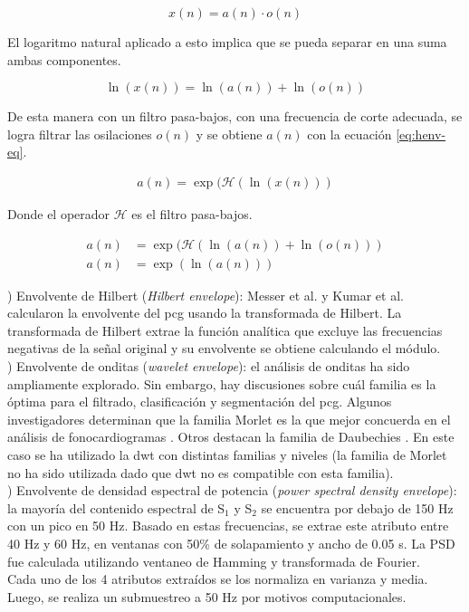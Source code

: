 \begin{equation}
  x(n) = a(n) \cdot o(n)
\end{equation}

El logaritmo natural aplicado a esto implica que se pueda separar en una suma ambas componentes.

\begin{equation}
  \ln(x(n)) = \ln(a(n)) + \ln(o(n))
\end{equation}

De esta manera con un filtro pasa-bajos, con una frecuencia de corte adecuada, se logra filtrar las osilaciones $o
(n)$ y se obtiene $a(n)$ con la ecuación \ref{eq:henv-eq}.

\begin{align} \label{eq:henv-eq}
a(n) = \exp(\mathcal{H}(\ln(x(n)))
\end{align}

Donde el operador $\mathcal{H}$ es el filtro pasa-bajos.

\begin{align*}
  a(n) &= \exp(\mathcal{H}(\ln(a(n)) + \ln(o(n))) \\
  a(n) &= \exp(\ln(a(n)))
\end{align*}

) Envolvente de Hilbert (\textit{Hilbert envelope}): Messer et al. \cite{ref:messer} y
Kumar et al. \cite{ref:kumar} calcularon la envolvente del \acrshort{pcg} usando la transformada de Hilbert.
La transformada de Hilbert extrae la función analítica que excluye las frecuencias negativas de la señal original
y su envolvente se obtiene calculando el módulo. \\
) Envolvente de onditas (\textit{wavelet envelope}): el análisis de onditas ha sido ampliamente explorado.
Sin embargo, hay discusiones sobre cuál familia es la óptima para el filtrado, clasificación y segmentación del
\acrshort{pcg}. Algunos investigadores determinan que la familia Morlet es la que mejor concuerda en el análisis de
fonocardiogramas \cite{ref:oskiper-watrous,ref:ergen-tatar-gulcur}.
Otros destacan la familia de Daubechies \cite{ref:liang-sakari-iiro,ref:gupta}.
En este caso se ha utilizado la \acrshort{dwt} con distintas familias y niveles (la familia de Morlet no ha sido
utilizada dado que \acrshort{dwt} no es compatible con esta familia). \\
) Envolvente de densidad espectral de potencia (\textit{power spectral density envelope}): la mayoría del
contenido espectral de S$_1$ y S$_2$ se encuentra por debajo de 150 Hz con un pico en 50 Hz. Basado en estas
frecuencias, se extrae este atributo entre 40 Hz y 60 Hz, en ventanas con 50\% de solapamiento y ancho de 0.05 s.
La PSD fue calculada utilizando ventaneo de Hamming y transformada de Fourier. \\
\indent Cada uno de los 4 atributos extraídos se los normaliza en varianza y media.
Luego, se realiza un submuestreo a 50 Hz por motivos computacionales.

